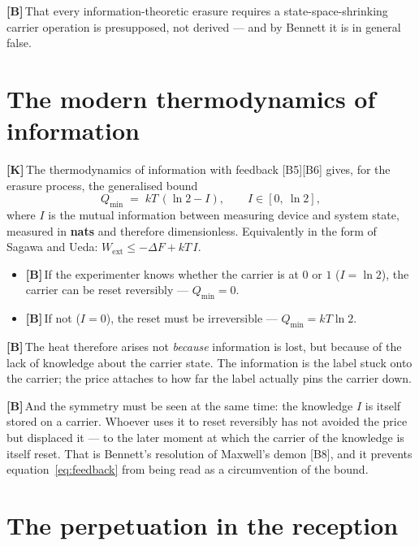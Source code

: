 \documentclass[11pt,a4paper]{article}
\newcommand{\LK}{\textcolor{layK}{\textbf{\footnotesize\textsf{[K]}}}\,}
\newcommand{\LB}{\textcolor{layB}{\textbf{\footnotesize\textsf{[B]}}}\,}
\theoremstyle{ffgft}
\begin{document}
\LB That every information-theoretic erasure requires a state-space-shrinking
carrier operation is presupposed, not derived --- and by Bennett it is in general
false.

\section{The modern thermodynamics of information}

\LK The thermodynamics of information with feedback [B5][B6] gives, for the
erasure process, the generalised bound
\begin{equation}
  Q_{\min} \;=\; k T\,(\ln 2 - I), \qquad I \in [0,\ \ln 2],
  \label{eq:feedback}
\end{equation}
where $I$ is the mutual information between measuring device and system state,
measured in \textbf{nats} and therefore dimensionless. Equivalently in the form of
Sagawa and Ueda: $W_{\text{ext}} \le -\Delta F + kT\,I$.

\begin{itemize}[leftmargin=1.4em,itemsep=0.25em]
  \item \LB If the experimenter knows whether the carrier is at $0$ or $1$
        ($I = \ln 2$), the carrier can be reset reversibly --- $Q_{\min} = 0$.
  \item \LB If not ($I = 0$), the reset must be irreversible ---
        $Q_{\min} = kT\ln 2$.
\end{itemize}

\LB The heat therefore arises not \emph{because} information is lost, but because
of the lack of knowledge about the carrier state. The information is the label
stuck onto the carrier; the price attaches to how far the label actually pins the
carrier down.

\LB And the symmetry must be seen at the same time: the knowledge $I$ is itself
stored on a carrier. Whoever uses it to reset reversibly has not avoided the price
but displaced it --- to the later moment at which the carrier of the knowledge is
itself reset. That is Bennett's resolution of Maxwell's demon [B8], and it
prevents equation~\eqref{eq:feedback} from being read as a circumvention of the
bound.

\section{The perpetuation in the reception}
\end{document}

